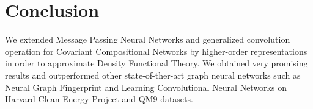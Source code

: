 \documentclass[sigchi]{acmart}
\theoremstyle{definition}
\theoremstyle{theorem}
\theoremstyle{corollary}
\theoremstyle{lemma}
\theoremstyle{remark}
\theoremstyle{prop}
\begin{document}
\section{Conclusion}

We extended Message Passing Neural Networks and generalized convolution operation for Covariant Compositional Networks by higher-order representations in order to approximate Density Functional Theory. We obtained very promising results and outperformed other state-of-ther-art graph neural networks such as Neural Graph Fingerprint and Learning Convolutional Neural Networks on Harvard Clean Energy Project and QM9 datasets.




\appendix
\end{document}
